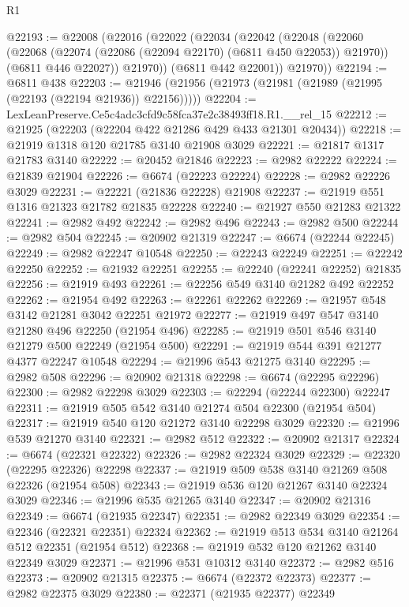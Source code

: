 \begin{lexlean}{R1}
\begin{coremodule}
@22193 := @22008
    (@22016
      (@22022
        (@22034
          (@22042
            (@22048
              (@22060
                (@22068 (@22074 (@22086 (@22094 @22170) (@6811 @450 @22053)) @21970))
                (@6811 @446 @22027))
              @21970))
          (@6811 @442 @22001))
        @21970))
@22194 := @6811 @438
@22203 := @21946 (@21956 (@21973 (@21981 (@21989 (@21995 (@22193 (@22194 @21936)) @22156)))))
@22204 := LexLeanPreserve.Ce5c4adc3cfd9c58fca37e2c38493ff18.R1.__rel_15
@22212 := @21925 (@22203 (@22204 @422 @21286 @429 @433 @21301 @20434))
@22218 := @21919 @1318 @120 @21785 @3140 @21908 @3029
@22221 := @21817 @1317 @21783 @3140
@22222 := @20452 @21846
@22223 := @2982 @22222
@22224 := @21839 @21904
@22226 := @6674 (@22223 @22224)
@22228 := @2982 @22226 @3029
@22231 := @22221 (@21836 @22228) @21908
@22237 := @21919 @551 @1316 @21323 @21782 @21835 @22228
@22240 := @21927 @550 @21283 @21322
@22241 := @2982 @492
@22242 := @2982 @496
@22243 := @2982 @500
@22244 := @2982 @504
@22245 := @20902 @21319
@22247 := @6674 (@22244 @22245)
@22249 := @2982 @22247 @10548
@22250 := @22243 @22249
@22251 := @22242 @22250
@22252 := @21932 @22251
@22255 := @22240 (@22241 @22252) @21835
@22256 := @21919 @493
@22261 := @22256 @549 @3140 @21282 @492 @22252
@22262 := @21954 @492
@22263 := @22261 @22262
@22269 := @21957 @548 @3142 @21281 @3042 @22251 @21972
@22277 := @21919 @497 @547 @3140 @21280 @496 @22250 (@21954 @496)
@22285 := @21919 @501 @546 @3140 @21279 @500 @22249 (@21954 @500)
@22291 := @21919 @544 @391 @21277 @4377 @22247 @10548
@22294 := @21996 @543 @21275 @3140
@22295 := @2982 @508
@22296 := @20902 @21318
@22298 := @6674 (@22295 @22296)
@22300 := @2982 @22298 @3029
@22303 := @22294 (@22244 @22300) @22247
@22311 := @21919 @505 @542 @3140 @21274 @504 @22300 (@21954 @504)
@22317 := @21919 @540 @120 @21272 @3140 @22298 @3029
@22320 := @21996 @539 @21270 @3140
@22321 := @2982 @512
@22322 := @20902 @21317
@22324 := @6674 (@22321 @22322)
@22326 := @2982 @22324 @3029
@22329 := @22320 (@22295 @22326) @22298
@22337 := @21919 @509 @538 @3140 @21269 @508 @22326 (@21954 @508)
@22343 := @21919 @536 @120 @21267 @3140 @22324 @3029
@22346 := @21996 @535 @21265 @3140
@22347 := @20902 @21316
@22349 := @6674 (@21935 @22347)
@22351 := @2982 @22349 @3029
@22354 := @22346 (@22321 @22351) @22324
@22362 := @21919 @513 @534 @3140 @21264 @512 @22351 (@21954 @512)
@22368 := @21919 @532 @120 @21262 @3140 @22349 @3029
@22371 := @21996 @531 @10312 @3140
@22372 := @2982 @516
@22373 := @20902 @21315
@22375 := @6674 (@22372 @22373)
@22377 := @2982 @22375 @3029
@22380 := @22371 (@21935 @22377) @22349

\end{coremodule}
\end{lexlean}
